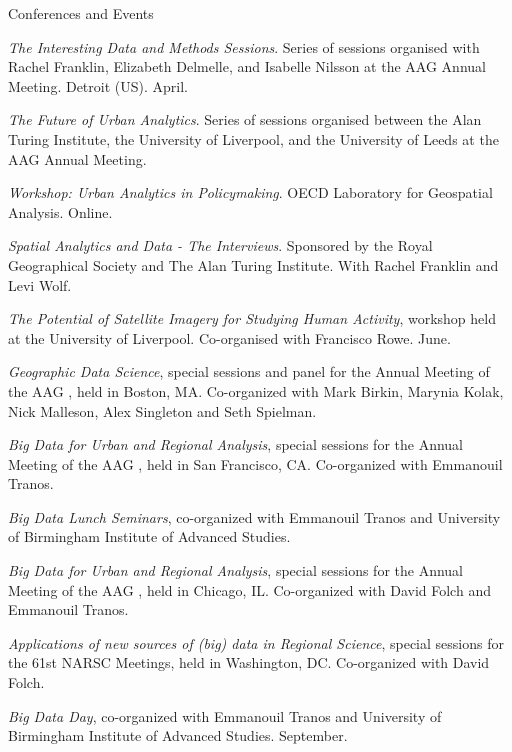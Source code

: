 \documentclass[12pt,2up]{article}
\begin{document}
\begin{cv}{}
\begin{cvlist}{Conferences and Events}
\item[2025] \textit{The Interesting Data and Methods Sessions}. Series of sessions
        organised with Rachel Franklin, Elizabeth Delmelle, and Isabelle
        Nilsson at the AAG Annual Meeting. Detroit (US). April.
\item[2023] \textit{The Future of Urban Analytics}. Series of sessions
        organised between the Alan Turing Institute, the University of
        Liverpool, and the University of Leeds at the AAG Annual Meeting.
\item[2022] \textit{Workshop: Urban Analytics in Policymaking}. OECD
        Laboratory for Geospatial Analysis. Online.
\item[2021-2023] \textit{Spatial Analytics and Data - The Interviews}. Sponsored
      by the Royal Geographical Society and The Alan Turing Institute. With
        Rachel Franklin and Levi Wolf.
\item[2018] \textit{The Potential of Satellite Imagery for Studying Human
    Activity}, workshop held at the University of Liverpool. Co-organised with
    Francisco Rowe. June.
\item[2017] \textit{Geographic Data Science},  special
    sessions and panel for the Annual Meeting of the AAG , held in Boston, MA. Co-organized
    with Mark Birkin, Marynia Kolak, Nick Malleson, Alex Singleton and Seth Spielman.
\item[2016] \textit{Big Data for Urban and Regional Analysis}, special
    sessions for the Annual Meeting of the AAG , held in San Francisco, CA. Co-organized
    with Emmanouil Tranos.
\item[2014/15] \textit{Big Data Lunch Seminars}, co-organized with Emmanouil
    Tranos and University of Birmingham Institute of Advanced Studies.
\item[2015] \textit{Big Data for Urban and Regional Analysis}, special
    sessions for the Annual Meeting of the AAG , held in Chicago, IL. Co-organized
    with David Folch and Emmanouil Tranos.
\item[2014] \textit{Applications of new sources of (big) data in Regional
    Science}, special sessions for the 61st NARSC Meetings, held in
    Washington, DC. Co-organized with David Folch.
\item[] \textit{Big Data Day}, co-organized with Emmanouil
    Tranos and University of Birmingham Institute of Advanced Studies.
    September.

\item[\textbf{Participation}]


\end{cvlist}
\end{cv}
\end{document}
